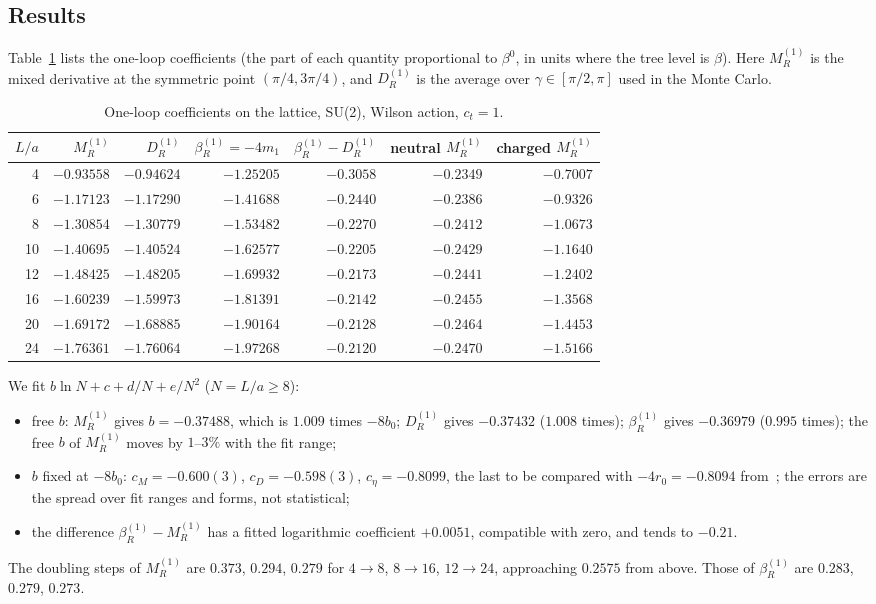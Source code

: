 \documentclass[11pt,a4paper]{article}
\theoremstyle{definition}
\theoremstyle{remark}
\newcommand{\bR}{\beta_R}
\newcommand{\DR}{D_R}
\begin{document}
\subsection{Results}

Table~\ref{tab:oneloop} lists the one-loop coefficients (the part of each quantity proportional to $\beta^0$, in units where the tree level is $\beta$). Here $M_R^{(1)}$ is the mixed derivative at the symmetric point $(\pi/4,3\pi/4)$, and $\DR^{(1)}$ is the average over $\gamma\in[\pi/2,\pi]$ used in the Monte Carlo.

\begin{table}[ht]\centering\footnotesize\setlength{\tabcolsep}{3.5pt}
\caption{One-loop coefficients on the lattice, SU(2), Wilson action, $c_t=1$.}\label{tab:oneloop}
\begin{tabular}{@{}rrrrrrr@{}}\toprule
$L/a$ & $M_R^{(1)}$ & $\DR^{(1)}$ & $\bR^{(1)}=-4m_1$ & $\bR^{(1)}-\DR^{(1)}$ & neutral $M_R^{(1)}$ & charged $M_R^{(1)}$\\\midrule
4 & $-0.93558$ & $-0.94624$ & $-1.25205$ & $-0.3058$ & $-0.2349$ & $-0.7007$\\
6 & $-1.17123$ & $-1.17290$ & $-1.41688$ & $-0.2440$ & $-0.2386$ & $-0.9326$\\
8 & $-1.30854$ & $-1.30779$ & $-1.53482$ & $-0.2270$ & $-0.2412$ & $-1.0673$\\
10 & $-1.40695$ & $-1.40524$ & $-1.62577$ & $-0.2205$ & $-0.2429$ & $-1.1640$\\
12 & $-1.48425$ & $-1.48205$ & $-1.69932$ & $-0.2173$ & $-0.2441$ & $-1.2402$\\
16 & $-1.60239$ & $-1.59973$ & $-1.81391$ & $-0.2142$ & $-0.2455$ & $-1.3568$\\
20 & $-1.69172$ & $-1.68885$ & $-1.90164$ & $-0.2128$ & $-0.2464$ & $-1.4453$\\
24 & $-1.76361$ & $-1.76064$ & $-1.97268$ & $-0.2120$ & $-0.2470$ & $-1.5166$\\\bottomrule
\end{tabular}
\end{table}

We fit $b\ln N+c+d/N+e/N^2$ ($N=L/a\ge8$):
\begin{itemize}[leftmargin=2em]
\item free $b$: $M_R^{(1)}$ gives $b=-0.37488$, which is $1.009$ times $-8b_0$; $\DR^{(1)}$ gives $-0.37432$ ($1.008$ times); $\bR^{(1)}$ gives $-0.36979$ ($0.995$ times); the free $b$ of $M_R^{(1)}$ moves by $1$--$3\%$ with the fit range;
\item $b$ fixed at $-8b_0$: $c_M=-0.600(3)$, $c_D=-0.598(3)$, $c_\eta=-0.8099$, the last to be compared with $-4r_0=-0.8094$ from~\cite[(7.39)]{LNWW}; the errors are the spread over fit ranges and forms, not statistical;
\item the difference $\bR^{(1)}-M_R^{(1)}$ has a fitted logarithmic coefficient $+0.0051$, compatible with zero, and tends to $-0.21$.
\end{itemize}
The doubling steps of $M_R^{(1)}$ are $0.373$, $0.294$, $0.279$ for $4\to8$, $8\to16$, $12\to24$, approaching $0.2575$ from above. Those of $\bR^{(1)}$ are $0.283$, $0.279$, $0.273$.
\end{document}
